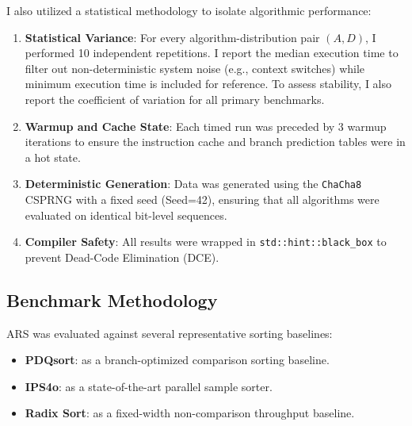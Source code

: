 I also utilized a statistical methodology to isolate algorithmic performance:
\begin{enumerate}
 \item \textbf{Statistical Variance}: For every algorithm-distribution pair $(A, D)$, I performed 10 independent repetitions. I report the median execution time to filter out non-deterministic system noise (e.g., context switches) while minimum execution time is included for reference. To assess stability, I also report the coefficient of variation for all primary benchmarks.
 \item \textbf{Warmup and Cache State}: Each timed run was preceded by 3 warmup iterations to ensure the instruction cache and branch prediction tables were in a hot state.
 \item \textbf{Deterministic Generation}: Data was generated using the \texttt{ChaCha8} CSPRNG with a fixed seed (Seed=42), ensuring that all algorithms were evaluated on identical bit-level sequences.
 \item \textbf{Compiler Safety}: All results were wrapped in \texttt{std::hint::black\_box} to prevent Dead-Code Elimination (DCE).
\end{enumerate}

\subsection{Benchmark Methodology}
ARS was evaluated against several representative sorting baselines:
\begin{itemize}
\item \textbf{PDQsort}: as a branch-optimized comparison sorting baseline.
\item \textbf{IPS4o}: as a state-of-the-art parallel sample sorter.
\item \textbf{Radix Sort}: as a fixed-width non-comparison throughput baseline.
\end{itemize}

